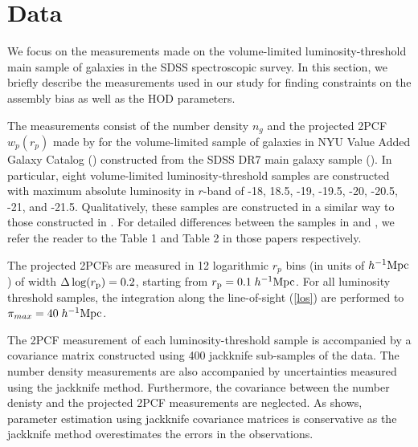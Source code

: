 \documentclass[12pt, preprint]{aastex}
\begin{document}
\section{Data}\label{sec:data}

We focus on the measurements made on the volume-limited luminosity-threshold main sample of galaxies in the SDSS spectroscopic survey. In this section, we briefly describe the measurements used in our study for finding constraints on the assembly bias as well as the HOD parameters.

The measurements consist of the number density $n_{g}$ and the projected 2PCF $w_{p}(r_{p})$ made by \citet{guo2015} for the volume-limited sample of galaxies in NYU Value Added Galaxy Catalog (\citealt{Blanton2005}) constructed from the SDSS DR7 main galaxy sample (\citealt{abazajian2009}). In particular, eight volume-limited luminosity-threshold samples are constructed with maximum absolute luminosity in $r$-band of -18, 18.5, -19, -19.5, -20, -20.5, -21, and -21.5. Qualitatively, these samples are constructed in a similar way to those constructed in \citet{zehavi2011}. For detailed differences between the samples in \citet{guo2015} and \citet{zehavi2011}, we refer the reader to the Table 1 and Table 2 in those papers respectively. 


The projected 2PCFs are measured in 12 logarithmic $r_{p}$ bins (in units of $h^{-1}\rm{Mpc}$) of width $\Delta \log(r_{\rm p}) = 0.2$, starting from $r_{\rm{p}} = 0.1 \; h^{-1}\rm{Mpc}$. For all luminosity threshold samples, the integration along the line-of-sight (\ref{los}) are performed to $\pi_{max}=40 \; h^{-1}\rm{Mpc}$. 

The 2PCF measurement of each luminosity-threshold sample is accompanied by a covariance matrix constructed using 400 jackknife sub-samples of the data. The number density measurements are also accompanied by uncertainties measured using the jackknife method. Furthermore, the covariance between the number denisty and the projected 2PCF measurements are neglected. As \citet{norberg} shows, parameter estimation using jackknife covariance matrices is conservative as the jackknife method overestimates the errors in the observations. 
\end{document}
